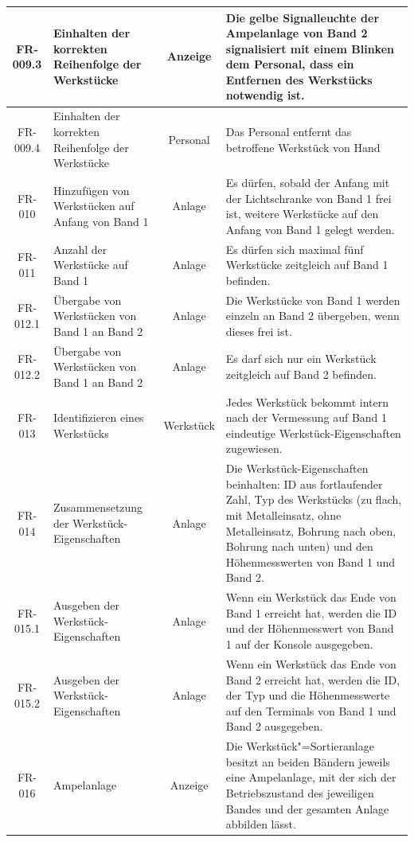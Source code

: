 \documentclass[oneside,a4paper,titlepage]{scrartcl}              %
\begin{document}
\begin{small}
\begin{center}
\begin{longtable}{|c|p{4cm}|c|p{7cm}|}
      \hline
      FR-009.3 & Einhalten der korrekten Reihenfolge der Werkstücke & Anzeige & Die gelbe Signalleuchte der Ampelanlage von Band 2 signalisiert mit einem Blinken dem Personal, dass ein Entfernen des Werkstücks notwendig ist.\\
      \hline
      FR-009.4 & Einhalten der korrekten Reihenfolge der Werkstücke & Personal & Das Personal entfernt das betroffene Werkstück von Hand\\
      \hline
      \rowcolor{lightgray} FR-010 & Hinzufügen von Werkstücken auf Anfang von Band 1 & Anlage & Es dürfen, sobald der Anfang mit der Lichtschranke von Band 1 frei ist, weitere Werkstücke auf den Anfang von Band 1 gelegt werden.\\
      \hline
      FR-011 & Anzahl der Werkstücke auf Band 1 & Anlage & Es dürfen sich maximal fünf Werkstücke zeitgleich auf Band 1 befinden.\\
      \hline
      \rowcolor{lightgray} FR-012.1 & Übergabe von Werkstücken von Band 1 an Band 2 & Anlage & Die Werkstücke von Band 1 werden einzeln an Band 2 übergeben, wenn dieses frei ist.\\
      \hline
      \rowcolor{lightgray} FR-012.2 & Übergabe von Werkstücken von Band 1 an Band 2 & Anlage & Es darf sich nur ein Werkstück zeitgleich auf Band 2 befinden.\\
      \hline
      FR-013 & Identifizieren eines Werkstücks & Werkstück & Jedes Werkstück bekommt intern nach der Vermessung auf Band 1 eindeutige Werkstück-Eigenschaften zugewiesen.\\
      \hline
      \rowcolor{lightgray} FR-014 & Zusammensetzung der Werkstück-Eigenschaften & Anlage & Die Werkstück-Eigenschaften beinhalten: ID aus fortlaufender Zahl, Typ des Werkstücks (zu flach, mit Metalleinsatz, ohne Metalleinsatz, Bohrung nach oben, Bohrung nach unten) und den Höhenmesswerten von Band 1 und Band 2.\\
      \hline
      FR-015.1 & Ausgeben der Werkstück-Eigenschaften & Anlage & Wenn ein Werkstück das Ende von Band 1 erreicht hat, werden die ID und der Höhenmesswert von Band 1 auf der Konsole ausgegeben.\\
      \hline
      FR-015.2 & Ausgeben der Werkstück-Eigenschaften & Anlage & Wenn ein Werkstück das Ende von Band 2 erreicht hat, werden die ID, der Typ und die Höhenmesswerte auf den Terminals von Band 1 und Band 2 ausgegeben.\\
      \hline
      \rowcolor{lightgray} FR-016 & Ampelanlage & Anzeige & Die Werkstück"=Sortieranlage besitzt an beiden Bändern jeweils eine Ampelanlage, mit der sich der Betriebszustand des jeweiligen Bandes und der gesamten Anlage abbilden lässt.\\

\end{longtable}
\end{center}
\end{small}
\end{document}
